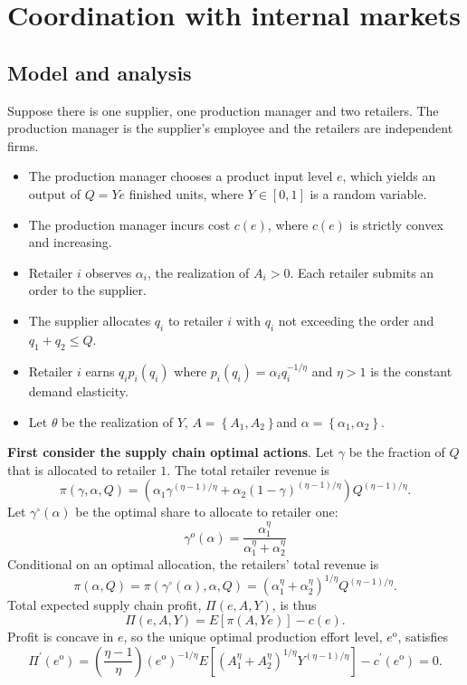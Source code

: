\newpage
\section{Coordination with internal markets}
\subsection{Model and analysis}
Suppose there is one supplier, one production manager and two retailers. The production manager is the supplier's employee and the retailers are independent firms.

\begin{itemize}
    \item The production manager chooses a product input level $e$, which yields an output of $Q=Y e$ finished units, where $Y\in\left[0,1\right]$ is a random variable.
    \item The production manager incurs cost $c(e)$, where $c(e)$ is strictly convex and increasing.
    \item Retailer $i$ observes $\alpha_i$, the realization of $A_i>0$. Each retailer submits an order to the supplier.
    \item The supplier allocates $q_i$ to retailer $i$ with $q_i$ not exceeding the order and $q_1+q_2\leq Q$.
    \item Retailer $i
    $ earns $q_i p_i(q_i)$ where $p_i(q_i)=\alpha_i q_i^{-1/\eta}$ and $\eta>1$ is the constant demand elasticity. 
    \item Let $\theta$ be the realization of $Y$, $A=\left\{A_1,A_2\right\} $and $\alpha=\left\{\alpha_1,\alpha_2\right\}$.
\end{itemize}

\textbf{First consider the supply chain optimal actions}. 
Let $\gamma$ be the fraction of $Q$ that is allocated to retailer $1$. The total retailer revenue is 
\begin{equation*}
    \pi(\gamma,\alpha,Q)=\left(\alpha_1 \gamma^{(\eta-1)/\eta}+\alpha_2 (1-\gamma)^{(\eta-1)/\eta}\right)Q^{(\eta-1)/\eta}.
\end{equation*}
Let $\gamma^{\circ}(\alpha)$ be the optimal share to allocate to retailer one:
\begin{equation}
    \gamma^{o}(\alpha)=\frac{\alpha_{1}^{\eta}}{\alpha_{1}^{\eta}+\alpha_{2}^{\eta}}
\end{equation}
Conditional on an optimal allocation, the retailers' total revenue is
$$
\pi(\alpha, Q)=\pi\left(\gamma^{\circ}(\alpha), \alpha, Q\right)=\left(\alpha_{1}^{\eta}+\alpha_{2}^{\eta}\right)^{1 / \eta} Q^{(\eta-1) / \eta} .
$$
Total expected supply chain profit, $\Pi(e, A, Y)$, is thus
$$
\Pi(e, A, Y)=E[\pi(A, Y e)]-c(e) .
$$
Profit is concave in $e$, so the unique optimal production effort level, $e^{\mathrm{o}}$, satisfies
\begin{equation}\label{eq:9.2}
    \Pi^{\prime}\left(e^{\mathrm{o}}\right)=\left(\frac{\eta-1}{\eta}\right)\left(e^{\mathrm{o}}\right)^{-1 / \eta} E\left[\left(A_{1}^{\eta}+A_{2}^{\eta}\right)^{1 / \eta} Y^{(\eta-1) / \eta}\right]-c^{\prime}\left(e^{\mathrm{o}}\right)=0.
\end{equation}

